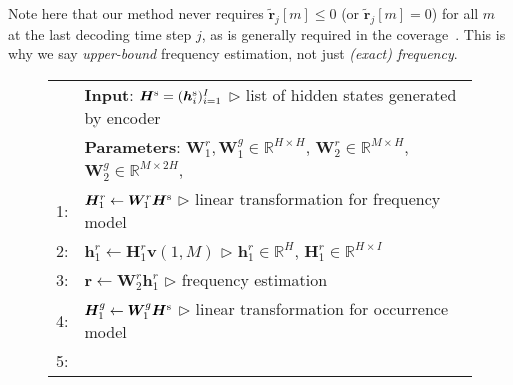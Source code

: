\documentclass[11pt]{article}
\begin{document}
   Note here that our method never requires $\tilde{\bm{r}}_{j}[m] \!\leq\! 0$ (or $\tilde{\bm{r}}_{j}[m] \!=\! 0$) for all $m$ at the last decoding time step $j$, as is generally required in the coverage~\cite{tu-EtAl:2016:P16-1,mi-EtAl:2016:EMNLP2016,DBLP:journals/corr/WuSCLNMKCGMKSJL16}.
   This is why we say {\it upper-bound} frequency estimation, not just {\it (exact) frequency}.



\begin{figure}[t]
 \centering
 \tabcolsep=1pt
 \small
 \begin{tabular}{rp{71mm}}
  \hline
  \ &\hspace{-1.2em}\textbf{Input}:
  $\bm{H}^{\rm s} = (\bm{h}^{\rm s}_i)^{I}_{i=1}$
  \hspace{\fill}
  $\triangleright$ {\scriptsize list of hidden states generated by encoder}
  \\
  \ &\hspace{-1.2em}\textbf{Parameters}:
      ${\bm W}^{r}_1, {\bm W}^{g}_1 \!\!\in\! \mathbb{R}^{H \times H}$,
      ${\bm W}^{r}_2 \!\!\in\! \mathbb{R}^{M \times H}$,
      ${\bm W}^{g}_2 \!\!\in\! \mathbb{R}^{M \times 2H}$,
      \\
  1:&\hspace{0.0em}
      $\bm{H}^{r}_1 \leftarrow \bm{W}^{r}_1\bm{H}^{\rm s}$
      \hspace{\fill}
      $\triangleright$ {\scriptsize linear transformation for frequency model}
      \\
  2:&\hspace{0.0em}
      $\bm{h}^{r}_1 \leftarrow \bm{H}^{r}_1\bm{v}(1,M)$
      \hspace{\fill}
      $\triangleright$ {\scriptsize $\bm{h}^{r}_1\in\mathbb{R}^{H}$, $\bm{H}^{r}_1\in\mathbb{R}^{H\times I}$}
      \\
  3:&\hspace{0.0em}
      ${\bm{r}} \leftarrow \bm{W}^{r}_2 \bm{h}^{r}_1$
      \hspace{\fill}
      $\triangleright$ {\scriptsize frequency estimation}
      \\
  4:&\hspace{0.0em}
      $\bm{H}^{g}_1 \leftarrow \bm{W}^{g}_1\bm{H}^{\rm s}$
      \hspace{\fill}
      $\triangleright$ {\scriptsize linear transformation for occurrence model}
      \\
  5:&\hspace{0.0em}

\end{tabular}
\end{figure}
\end{document}
